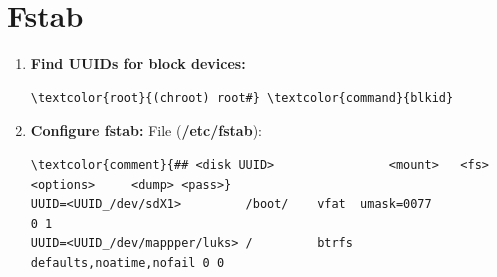 \documentclass[10pt, a4paper, onecolumn, oneside, titlepage, openany]{book}
\begin{document}
\section{Fstab}
\begin{enumerate}
    \item \textbf{Find UUIDs for block devices:}
\begin{Verbatim}[commandchars=\\\{\}]
\textcolor{root}{(chroot) root#} \textcolor{command}{blkid}
\end{Verbatim}
    \item \textbf{Configure fstab:}
\newline File (\textbf{\textcolor{file}{/etc/fstab}}):
\begin{Verbatim}[commandchars=\\\{\}]
\textcolor{comment}{## <disk UUID>                <mount>   <fs>  <options>     <dump> <pass>}
UUID=<UUID_/dev/sdX1>         /boot/    vfat  umask=0077              0 1
UUID=<UUID_/dev/mappper/luks> /         btrfs defaults,noatime,nofail 0 0
\end{Verbatim}
\end{enumerate}
\end{document}
